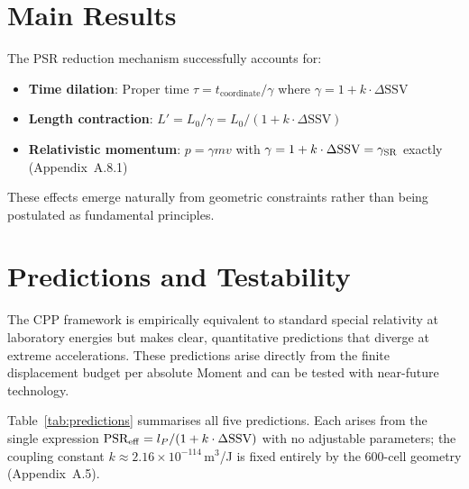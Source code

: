 \documentclass[11pt,letterpaper]{article}
\begin{document}
\section{Main Results}

The PSR reduction mechanism successfully accounts for:
\begin{itemize}
    \item \textbf{Time dilation}: Proper time $\tau = t_{\text{coordinate}} / \gamma$ where $\gamma = 1 + k \cdot \Delta\text{SSV}$
    \item \textbf{Length contraction}: $L' = L_0 / \gamma = L_0 / (1 + k \cdot \Delta\text{SSV})$
    \item \textbf{Relativistic momentum}: $p = \gamma m v$ with $\gamma = 1 + k \cdot \Delta\text{SSV} = \gamma_{\rm SR}$ exactly (Appendix~A.8.1)
\end{itemize}

These effects emerge naturally from geometric constraints rather than being postulated as fundamental principles.

\section{Predictions and Testability}

The CPP framework is empirically equivalent to standard special relativity at laboratory energies but makes clear, quantitative predictions that diverge at extreme accelerations. These predictions arise directly from the finite displacement budget per absolute Moment and can be tested with near-future technology.

Table~\ref{tab:predictions} summarises all five predictions. Each arises from the single expression $\text{PSR}_{\rm eff} = l_P/(1+k\cdot\Delta\text{SSV})$ with no adjustable parameters; the coupling constant $k \approx 2.16\times10^{-114}$\,m$^3$/J is fixed entirely by the 600-cell geometry (Appendix~A.5).
\end{document}

